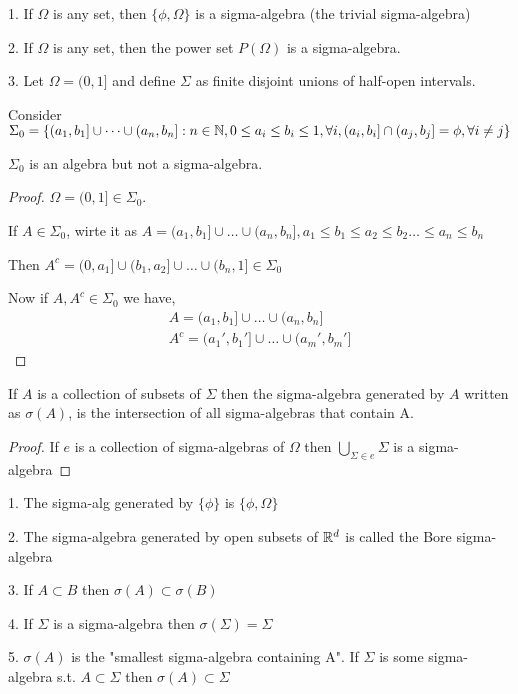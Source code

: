 \begin{eg}
\item 1. If $\Omega$ is any set, then $\{\phi, \Omega\}$ is a sigma-algebra (the trivial sigma-algebra)

\item 2. If $\Omega$ is any set, then the power set $P(\Omega)$ is a sigma-algebra.

\item 3. Let  $\Omega = (0,1]$ and define $\Sigma$ as finite disjoint unions of half-open intervals.
\end{eg}



Consider $\Sigma_0 = \{(a_1,b_1] \cup \dots \cup (a_n,b_n]: n\in \mathbb{N}, 0 \le a_i \le b_i \le 1, \forall i, (a_i,b_i]\cap (a_j,b_j] = \phi, \forall i \ne j\}$
\begin{prop}
    $\Sigma_0$ is an algebra but not a sigma-algebra.
\end{prop}
\begin{proof}
    $\Omega = (0,1] \in \Sigma_0$. 

    If  $A \in \Sigma_0$, wirte it as $A = (a_1,b_1] \cup \dots \cup (a_n,b_n], a_1 \le b_1 \le a_2 \le b_2 \dots \le a_n \le b_n$

    Then $A^c = (0,a_1] \cup (b_1,a_2] \cup \dots \cup (b_n,1] \in \Sigma_0$

    Now if $A, A^c \in \Sigma_0$ we have, 
    \begin{align*}
        A = (a_1,b_1] \cup \dots \cup (a_n,b_n]\\
        A^c = (a_1',b_1'] \cup \dots \cup (a_m', b_m']
    \end{align*}
    
\end{proof}


\begin{definition}
    If $A$ is a collection of subsets of $\Sigma$ then the sigma-algebra generated by $A$ written as $\sigma(A)$, is the intersection of all sigma-algebras that contain A.
\end{definition}
\begin{proof}
    If $e$ is a collection of sigma-algebras of $\Omega$ then $\bigcup_{\Sigma \in e} \Sigma$ is a sigma-algebra
\end{proof}


\begin{eg}
\item 1. The sigma-alg generated by $\{\phi\}$ is $\{\phi, \Omega\}$

\item 2. The sigma-algebra generated by open subsets of  $\mathbb{R}^d$ is called the Bore sigma-algebra

\item 3. If $A \subset B$ then $\sigma(A) \subset \sigma(B)$

\item 4. If $\Sigma$ is a sigma-algebra then $\sigma(\Sigma) = \Sigma$

\item 5. $\sigma(A)$ is the "smallest sigma-algebra containing A". If $\Sigma$ is some sigma-algebra s.t. $A \subset \Sigma$ then $\sigma(A) \subset \Sigma$
\end{eg}


